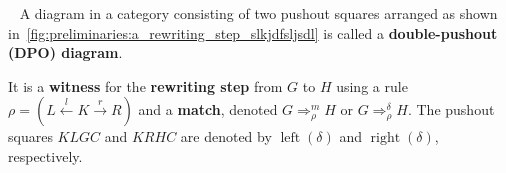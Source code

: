 \begin{definition}
  \label{def:rewriting_step}
    \ \newline
    \noindent
    A diagram in a category consisting of two pushout squares arranged as shown in~\autoref{fig:preliminaries:a_rewriting_step_slkjdfsljsdl} is called a \textbf{double-pushout (DPO) diagram}.
      \begin{figure}[H]
        \centering
        \caption{}
        \label{fig:preliminaries:a_rewriting_step_slkjdfsljsdl}
      \end{figure}
      It is a \textbf{witness} for the \textbf{rewriting step} from \( G \) to \( H \) using 
      a rule \( \rho = (L \overset{l}{\leftarrow} K \overset{r}{\rightarrow} R) \) and a \textbf{match}, denoted \( G \Rightarrow_\rho^m H \) or \( G \Rightarrow_\rho^\delta H \). The pushout squares $KLGC$ and $KRHC$ are denoted by $\operatorname{left}(\delta)$ and $\operatorname{right}(\delta)$, respectively.
  \end{definition}
